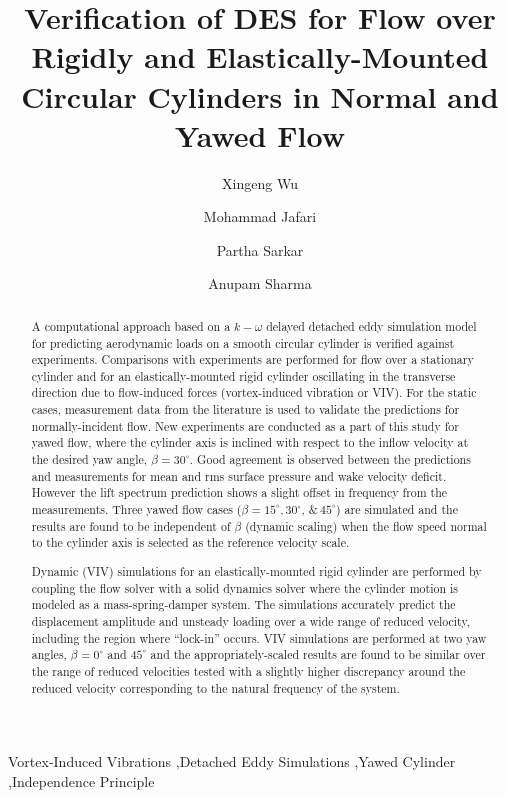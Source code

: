 \documentclass[12pt,authoryear]{elsarticle}
\begin{document}
\begin{frontmatter}

\title{Verification of DES for Flow over Rigidly and Elastically-Mounted
Circular Cylinders in Normal and Yawed Flow}


\author[1]{Xingeng Wu}
\author[1]{Mohammad Jafari} 
\author[2]{Partha Sarkar}
\author[3]{Anupam Sharma}

\address{Department of Aerospace Engineering, Iowa State University, Ames, Iowa, 50011}

\begin{abstract}
A computational approach based on a $k-\omega$ delayed detached eddy simulation
model for predicting aerodynamic loads on a smooth circular cylinder is
verified against experiments. Comparisons with experiments are performed for
flow over a stationary cylinder and for an elastically-mounted rigid cylinder
oscillating in the transverse direction due to flow-induced forces
(vortex-induced vibration or VIV). For the static cases, measurement data from
the literature is used to validate the predictions for normally-incident flow.
New experiments are conducted as a part of this study for yawed flow, where the
cylinder axis is inclined with respect to the inflow velocity at the desired
yaw angle, $\beta=30^\circ$. Good agreement is observed between the predictions
and measurements for mean and rms surface pressure and wake velocity deficit.
However the lift spectrum prediction shows a slight offset in frequency from
the measurements. Three yawed flow cases ($\beta=15^\circ, 30^\circ, \,\&\,
45^\circ$) are simulated and the results are found to be independent of $\beta$
(dynamic scaling) when the flow speed normal to the cylinder axis is selected
as the reference velocity scale.

Dynamic (VIV) simulations for an elastically-mounted rigid cylinder are
performed by coupling the flow solver with a solid dynamics solver where the
cylinder motion is modeled as a mass-spring-damper system. The simulations
accurately predict the displacement amplitude and unsteady loading over a wide
range of reduced velocity, including the region where ``lock-in'' occurs. VIV
simulations are performed at two yaw angles, $\beta=0^\circ$ and $45^\circ$ and
the appropriately-scaled results are found to be similar over the range of
reduced velocities tested with a slightly higher discrepancy around the reduced
velocity corresponding to the natural frequency of the system.
\end{abstract}

\begin{keyword}
  Vortex-Induced Vibrations \sep Detached Eddy Simulations \sep Yawed Cylinder
  \sep Independence Principle
\end{keyword}
\end{frontmatter}
\end{document}
